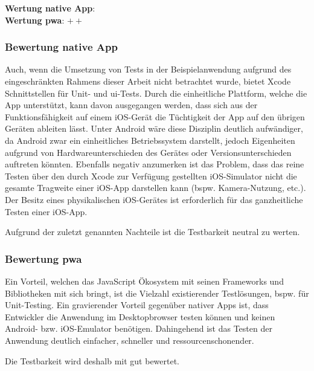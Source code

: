 \textbf{Wertung native App}: \Circle \\
\textbf{Wertung \ac{pwa}}: $++$

\subsubsection{Bewertung native App}
Auch, wenn die Umsetzung von Tests in der Beispielanwendung aufgrund des eingeschränkten Rahmens dieser Arbeit nicht betrachtet wurde, bietet Xcode Schnittstellen für Unit- und \ac{ui}-Tests. Durch die einheitliche Plattform, welche die App unterstützt, kann davon ausgegangen werden, dass sich aus der Funktionsfähigkeit auf einem iOS-Gerät die Tüchtigkeit der App auf den übrigen Geräten ableiten lässt. Unter Android wäre diese Disziplin deutlich aufwändiger, da Android zwar ein einheitliches Betriebssystem darstellt, jedoch Eigenheiten aufgrund von Hardwareunterschieden des Gerätes oder Versionsunterschieden auftreten könnten. Ebenfalls negativ anzumerken ist das Problem, dass das reine Testen über den durch Xcode zur Verfügung gestellten iOS-Simulator nicht die gesamte Tragweite einer iOS-App darstellen kann (bspw. Kamera-Nutzung, etc.). Der Besitz eines physikalischen iOS-Gerätes ist erforderlich für das ganzheitliche Testen einer iOS-App.

Aufgrund der zuletzt genannten Nachteile ist die Testbarkeit neutral zu werten.

\subsubsection{Bewertung \ac{pwa}}
Ein Vorteil, welchen das JavaScript Ökosystem mit seinen Frameworks und Bibliotheken mit sich bringt, ist die Vielzahl existierender Testlösungen, bspw. für Unit-Testing. Ein gravierender Vorteil gegenüber nativer Apps ist, dass Entwickler die Anwendung im Desktopbrowser testen können und keinen Android- bzw. iOS-Emulator benötigen. Dahingehend ist das Testen der Anwendung deutlich einfacher, schneller und ressourcenschonender.

Die Testbarkeit wird deshalb mit gut bewertet.